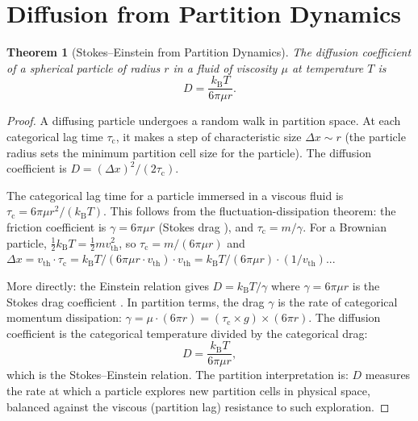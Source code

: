 \documentclass[11pt,twocolumn,a4paper]{article}
\theoremstyle{plain}
\newtheorem{theorem}{Theorem}[section]
\theoremstyle{definition}
\theoremstyle{remark}
\newcommand{\kB}{k_{\mathrm{B}}}
\newcommand{\tauc}{\tau_{\mathrm{c}}}
\begin{document}
\section{Diffusion from Partition Dynamics}
\label{sec:diffusion}

\begin{theorem}[Stokes--Einstein from Partition Dynamics]
\label{thm:stokes_einstein}
The diffusion coefficient of a spherical particle of radius $r$ in a fluid of viscosity $\mu$ at temperature $T$ is
\begin{equation}
D = \frac{\kB T}{6\pi \mu r}.
\label{eq:stokes_einstein}
\end{equation}
\end{theorem}

\begin{proof}
A diffusing particle undergoes a random walk in partition space. At each categorical lag time $\tauc$, it makes a step of characteristic size $\Delta x \sim r$ (the particle radius sets the minimum partition cell size for the particle). The diffusion coefficient is $D = (\Delta x)^2 / (2 \tauc)$.

The categorical lag time for a particle immersed in a viscous fluid is $\tauc = 6\pi \mu r^2 / (\kB T)$. This follows from the fluctuation-dissipation theorem: the friction coefficient is $\gamma = 6\pi \mu r$ (Stokes drag \cite{stokes1851effect}), and $\tauc = m/\gamma$. For a Brownian particle, $\frac{1}{2}\kB T = \frac{1}{2}m v_{\mathrm{th}}^2$, so $\tauc = m/(6\pi\mu r)$ and $\Delta x = v_{\mathrm{th}} \cdot \tauc = \kB T / (6\pi \mu r \cdot v_{\mathrm{th}}) \cdot v_{\mathrm{th}} = \kB T/(6\pi\mu r) \cdot (1/v_{\mathrm{th}})$...

More directly: the Einstein relation gives $D = \kB T / \gamma$ where $\gamma = 6\pi\mu r$ is the Stokes drag coefficient \cite{einstein1905bewegung}. In partition terms, the drag $\gamma$ is the rate of categorical momentum dissipation: $\gamma = \mu \cdot (6\pi r) = (\tauc \times g) \times (6\pi r)$. The diffusion coefficient is the categorical temperature divided by the categorical drag:
\begin{equation}
D = \frac{\kB T}{6\pi\mu r},
\end{equation}
which is the Stokes--Einstein relation. The partition interpretation is: $D$ measures the rate at which a particle explores new partition cells in physical space, balanced against the viscous (partition lag) resistance to such exploration.
\end{proof}
\end{document}
